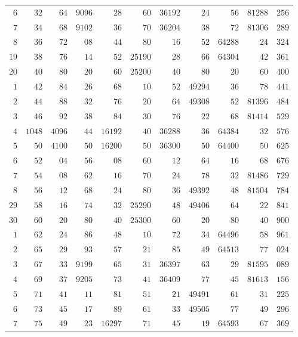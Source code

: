 \begin{longtable}{@{}r|r|r|r|r|r|r|r|r|r|r@{}}
$6$ & $32$ & $64$ & $9096$ & $28$ & $60$ & $36192$ & $24$ & $56$ & $81288$ & $256$\\
$7$ & $34$ & $68$ & $9102$ & $36$ & $70$ & $36204$ & $38$ & $72$ & $81306$ & $289$\\
$8$ & $36$ & $72$ & $08$ & $44$ & $80$ & $16$ & $52$ & $64288$ & $24$ & $324$\\
$19$ & $38$ & $76$ & $14$ & $52$ & $25190$ & $28$ & $66$ & $64304$ & $42$ & $361$\\
$20$ & $40$ & $80$ & $20$ & $60$ & $25200$ & $40$ & $80$ & $20$ & $60$ & $400$\\
$1$ & $42$ & $84$ & $26$ & $68$ & $10$ & $52$ & $49294$ & $36$ & $78$ & $441$\\
$2$ & $44$ & $88$ & $32$ & $76$ & $20$ & $64$ & $49308$ & $52$ & $81396$ & $484$\\
$3$ & $46$ & $92$ & $38$ & $84$ & $30$ & $76$ & $22$ & $68$ & $81414$ & $529$\\
$4$ & $1048$ & $4096$ & $44$ & $16192$ & $40$ & $36288$ & $36$ & $64384$ & $32$ & $576$\\
$5$ & $50$ & $4100$ & $50$ & $16200$ & $50$ & $36300$ & $50$ & $64400$ & $50$ & $625$\\
$6$ & $52$ & $04$ & $56$ & $08$ & $60$ & $12$ & $64$ & $16$ & $68$ & $676$\\
$7$ & $54$ & $08$ & $62$ & $16$ & $70$ & $24$ & $78$ & $32$ & $81486$ & $729$\\
$8$ & $56$ & $12$ & $68$ & $24$ & $80$ & $36$ & $49392$ & $48$ & $81504$ & $784$\\
$29$ & $58$ & $16$ & $74$ & $32$ & $25290$ & $48$ & $49406$ & $64$ & $22$ & $841$\\
$30$ & $60$ & $20$ & $80$ & $40$ & $25300$ & $60$ & $20$ & $80$ & $40$ & $900$\\
$1$ & $62$ & $24$ & $86$ & $48$ & $10$ & $72$ & $34$ & $64496$ & $58$ & $961$\\
$2$ & $65$ & $29$ & $93$ & $57$ & $21$ & $85$ & $49$ & $64513$ & $77$ & $024$\\
$3$ & $67$ & $33$ & $9199$ & $65$ & $31$ & $36397$ & $63$ & $29$ & $81595$ & $089$\\
$4$ & $69$ & $37$ & $9205$ & $73$ & $41$ & $36409$ & $77$ & $45$ & $81613$ & $156$\\
$5$ & $71$ & $41$ & $11$ & $81$ & $51$ & $21$ & $49491$ & $61$ & $31$ & $225$\\
$6$ & $73$ & $45$ & $17$ & $89$ & $61$ & $33$ & $49505$ & $77$ & $49$ & $296$\\
$7$ & $75$ & $49$ & $23$ & $16297$ & $71$ & $45$ & $19$ & $64593$ & $67$ & $369$\\

\end{longtable}

